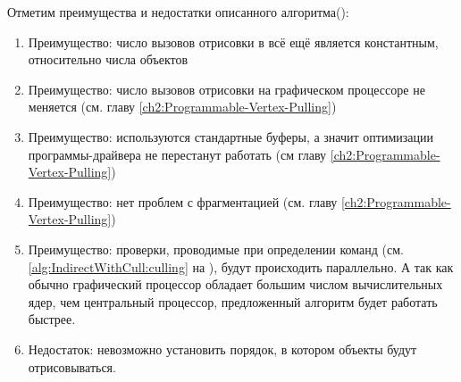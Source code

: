 Отметим преимущества и недостатки описанного алгоритма():
\begin{enumerate}[1.] 
	\item Преимущество: число вызовов отрисовки в  всё ещё является константным, относительно числа объектов
	\item Преимущество: число вызовов отрисовки на графическом процессоре не меняется (см. главу \ref{ch2:Programmable-Vertex-Pulling})
	\item Преимущество: используются стандартные буферы, а значит оптимизации программы-драйвера не перестанут работать (см главу \ref{ch2:Programmable-Vertex-Pulling})
	\item Преимущество: нет проблем с фрагментацией (см. главу \ref{ch2:Programmable-Vertex-Pulling})
	\item Преимущество: проверки, проводимые при определении  команд (см. \ref{alg:IndirectWithCull:culling} на ), будут происходить параллельно. А так как обычно графический процессор обладает большим числом вычислительных ядер, чем центральный процессор, предложенный алгоритм будет работать быстрее.
	\item Недостаток: невозможно установить порядок, в котором объекты будут отрисовываться.
\end{enumerate}